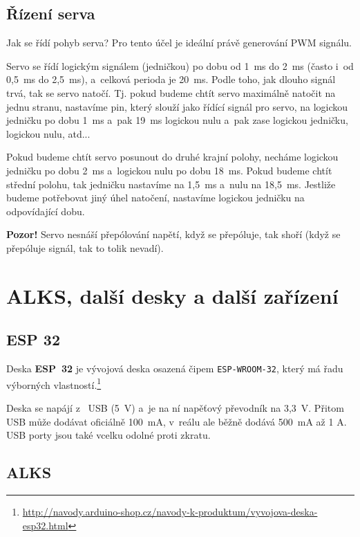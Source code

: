 \subsection{Řízení serva}

 Jak se řídí pohyb serva? Pro tento účel je ideální právě generování PWM signálu. 

Servo se řídí logickým signálem (jedničkou) po dobu od 1~ms do 2~ms (často i~od 0,5~ms do 2,5~ms), 
a~celková perioda je 20~ms. Podle toho, jak dlouho signál trvá, tak se servo natočí. 
Tj. pokud budeme chtít servo maximálně natočit na jednu stranu, nastavíme pin, který 
slouží jako řídící signál pro servo, na logickou jedničku po dobu 1~ms a~pak 19~ms logickou nulu a~pak zase logickou jedničku, logickou nulu, atd... 

Pokud budeme chtít servo posunout do druhé krajní polohy, necháme logickou jedničku po dobu 2~ms a~logickou nulu po dobu 18~ms. 
Pokud budeme chtít střední polohu, tak jedničku nastavíme na 1,5~ms a~nulu na 18,5~ms. 
Jestliže budeme potřebovat jiný úhel natočení, nastavíme logickou jedničku na odpovídající dobu.

{\bf Pozor!} Servo nesnáší přepólování napětí, když se přepóluje, tak shoří (když se přepóluje signál, tak to tolik nevadí).

\section{ALKS, další desky a další zařízení}

\label{esp32} \subsection{ESP 32}

Deska {\bf ESP~32}  je vývojová deska osazená čipem {\tt ESP-WROOM-32}, který má řadu výborných vlastností.\footnote{\url{http://navody.arduino-shop.cz/navody-k-produktum/vyvojova-deska-esp32.html} }

Deska se napájí z~ USB (5~V) a~je na ní napěťový převodník
na 3,3~V. Přitom USB může dodávat oficiálně 100~mA, v~reálu ale běžně dodává 500~mA až 1 A. USB porty jsou také vcelku odolné proti zkratu.   

\label{alks} \subsection{ALKS}

